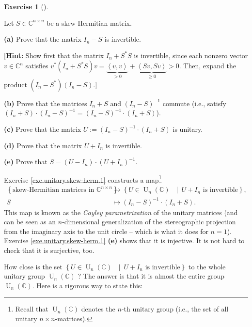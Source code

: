 \documentclass[numbers=enddot,12pt,final,onecolumn,notitlepage]{scrartcl}%
\newcounter{exer}
\numberwithin{exer}{subsection}
\theoremstyle{definition}
\newtheorem{exmp}[exer]{Exercise}
\newenvironment{exercise}[1][]
{\begin{exmp}[#1]\begin{leftbar}}
{\end{leftbar}\end{exmp}}
\begin{document}
\begin{exercise}
 \label{exe.unitary.skew-herm.1}Let $S\in\mathbb{C}^{n\times n}$ be a
skew-Hermitian matrix.

\textbf{(a)} Prove that the matrix $I_{n}-S$ is invertible.

[\textbf{Hint:} Show first that the matrix $I_{n}+S^{\ast}S$ is invertible,
since each nonzero vector $v\in\mathbb{C}^{n}$ satisfies $v^{\ast}\left(
I_{n}+S^{\ast}S\right)  v=\underbrace{\left\langle v,v\right\rangle }%
_{>0}+\underbrace{\left\langle Sv,Sv\right\rangle }_{\geq0}>0$. Then, expand
the product $\left(  I_{n}-S^{\ast}\right)  \left(  I_{n}-S\right)  $.]

\textbf{(b)} Prove that the matrices $I_{n}+S$ and $\left(  I_{n}-S\right)
^{-1}$ commute (i.e., satisfy $\left(  I_{n}+S\right)  \cdot\left(
I_{n}-S\right)  ^{-1}=\left(  I_{n}-S\right)  ^{-1}\cdot\left(  I_{n}%
+S\right)  $).

\textbf{(c)} Prove that the matrix $U:=\left(  I_{n}-S\right)  ^{-1}%
\cdot\left(  I_{n}+S\right)  $ is unitary.

\textbf{(d)} Prove that the matrix $U+I_{n}$ is invertible.

\textbf{(e)} Prove that $S=\left(  U-I_{n}\right)  \cdot\left(  U+I_{n}%
\right)  ^{-1}$.
\end{exercise}

Exercise \ref{exe.unitary.skew-herm.1} constructs a map\footnote{Recall that
$\operatorname*{U}\nolimits_{n}\left(  \mathbb{C}\right)  $ denotes the $n$-th
unitary group (i.e., the set of all unitary $n\times n$-matrices).}%
\begin{align*}
\left\{  \text{skew-Hermitian matrices in }\mathbb{C}^{n\times n}\right\}   &
\rightarrow\left\{  U\in\operatorname*{U}\nolimits_{n}\left(  \mathbb{C}%
\right)  \text{ }\mid\ U+I_{n}\text{ is invertible}\right\}  ,\\
S  &  \mapsto\left(  I_{n}-S\right)  ^{-1}\cdot\left(  I_{n}+S\right)  .
\end{align*}
This map is known as the \emph{Cayley parametrization} of the unitary matrices
(and can be seen as an $n$-dimensional generalization of the stereographic
projection from the imaginary axis to the unit circle -- which is what it does
for $n=1$). Exercise \ref{exe.unitary.skew-herm.1} \textbf{(e)} shows that it
is injective. It is not hard to check that it is surjective, too.

How close is the set $\left\{  U\in\operatorname*{U}\nolimits_{n}\left(
\mathbb{C}\right)  \text{ }\mid\ U+I_{n}\text{ is invertible}\right\}  $ to
the whole unitary group $\operatorname*{U}\nolimits_{n}\left(  \mathbb{C}%
\right)  $ ? The answer is that it is almost the entire group
$\operatorname*{U}\nolimits_{n}\left(  \mathbb{C}\right)  $. Here is a
rigorous way to state this:
\end{document}
